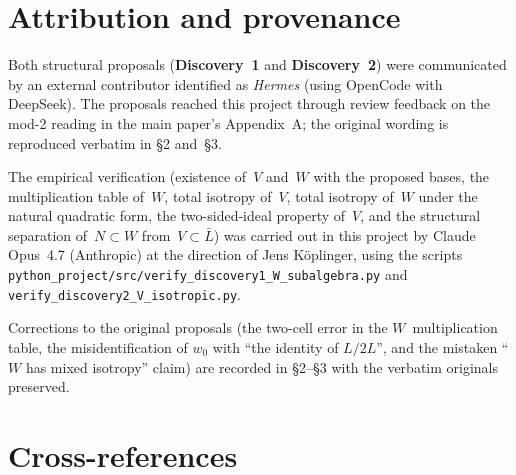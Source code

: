 \documentclass[11pt]{amsart}
\begin{document}
\section*{Attribution and provenance}

Both structural proposals (\textbf{Discovery~1} and \textbf{Discovery~2})
were communicated by an external contributor identified as
\emph{Hermes} (using OpenCode with DeepSeek). The proposals reached this project
through review feedback on the mod-2 reading in the main paper's
Appendix~A; the original wording is reproduced
verbatim in \S2 and~\S3.

The empirical verification (existence of~$V$ and~$W$ with the
proposed bases, the multiplication table of~$W$, total isotropy
of~$V$, total isotropy of~$W$ under the natural quadratic form,
the two-sided-ideal property of~$V$, and the structural separation
of~$N \subset W$ from~$V \subset \bar L$) was carried out in this
project by Claude Opus~4.7 (Anthropic) at the direction of Jens
K\"oplinger, using the scripts
\texttt{python\_project/src/verify\_discovery1\_W\_subalgebra.py}
and \texttt{verify\_discovery2\_V\_isotropic.py}.

Corrections to the original proposals (the two-cell error in
the $W$~multiplication table, the misidentification of $w_0$ with
``the identity of $L/2L$'', and the mistaken ``$W$ has mixed
isotropy'' claim) are recorded in \S2--\S3 with the verbatim
originals preserved.

\section*{Cross-references}
\end{document}
